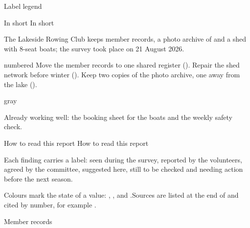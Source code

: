 \documentclass[a4paper,11pt]{article}
\begin{document}
\RdTitlePage
\RdTableOfContents
\begin{RdLegend}{Label legend}
\end{RdLegend}


{In short}
{In short}

The Lakeside Rowing Club keeps  member records, a photo archive of
 and a shed with 8-seat boats; the survey took place on 21 August
2026.
\par
\begin{RdList}{numbered}
\RdItem Move the member records to one shared register ().
\RdItem Repair the shed network before winter ().
\RdItem Keep two copies of the photo archive, one away from the lake ().
\end{RdList}
\begin{RdBox}{gray}{}

Already working well: the booking sheet for the boats and the weekly safety check.
\par
\end{RdBox}


{How to read this report}
{How to read this report}

Each finding carries a label:  seen during the survey,
 reported by the volunteers,  agreed
by the committee,  suggested here, 
still to be checked and  needing action before the
next season.
\par

Colours mark the state of a value: , ,
 and .\RdBreak{}Sources
are listed at the end of  and cited by number, for
example .
\par

{Member records}
\end{document}
